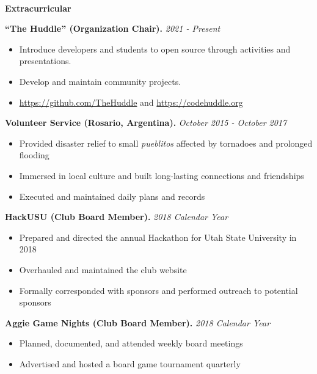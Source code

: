 \documentclass[letterpaper,11pt]{article}
\begin{document}

\begin{Large}\textbf{\\Extracurricular}\end{Large}

\textbf{``The Huddle'' (Organization Chair).} \textit{2021 - Present}
\begin{itemize}[noitemsep,topsep=0pt]
	\item Introduce developers and students to open source through activities and presentations.
	\item Develop and maintain community projects.
	\item \url{https://github.com/TheHuddle} and \url{https://codehuddle.org}\\
\end{itemize}

\textbf{Volunteer Service (Rosario, Argentina).} \textit{October 2015 - October 2017}
\begin{itemize}[noitemsep,topsep=0pt]
	\item Provided disaster relief to small \textit{pueblitos} affected by tornadoes and prolonged flooding
	\item Immersed in local culture and built long-lasting connections and friendships
	\item Executed and maintained daily plans and records\\
\end{itemize}

\textbf{HackUSU (Club Board Member).} \textit{2018 Calendar Year}
\begin{itemize}[noitemsep,topsep=0pt]
	\item Prepared and directed the annual Hackathon for Utah State University in 2018
	\item Overhauled and maintained the club website
	\item Formally corresponded with sponsors and performed outreach to potential sponsors\\
\end{itemize}

\textbf{Aggie Game Nights (Club Board Member).} \textit{2018 Calendar Year}
\begin{itemize}[noitemsep,topsep=0pt]
	\item Planned, documented, and attended weekly board meetings
	\item Advertised and hosted a board game tournament quarterly\\
\end{itemize}
\end{document}
